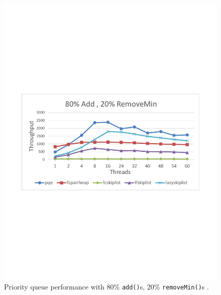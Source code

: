 \begin{figure}[htb]
\begin{minipage}[b]{.495\textwidth}
		\includegraphics[width=\linewidth]{graphics/sparc-80-20.pdf}
		\caption{Priority queue performance with 80\% \texttt{add()}s, 20\% \texttt{removeMin()}s \cite{calciu_adaptive_2014}.}
		\label{fig:sparc_80}
	\end{minipage}
	\begin{minipage}[b]{.495\textwidth}
		\centering

\end{minipage}
\end{figure}

